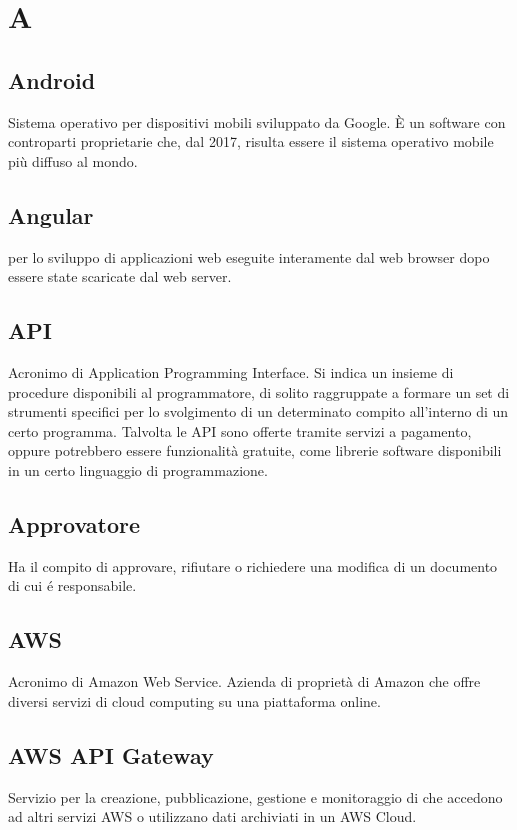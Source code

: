 \section*{A}
\markright{}

\subsection*{Android}
Sistema operativo per dispositivi mobili sviluppato da Google. È un software  con controparti proprietarie che, dal 2017, risulta essere il sistema operativo mobile più diffuso al mondo. 
 
\subsection*{Angular}
  per lo sviluppo di applicazioni web eseguite interamente dal web browser dopo essere state scaricate dal web server.

\subsection*{API}
Acronimo di Application Programming Interface. Si indica un  insieme  di  procedure disponibili al programmatore, di solito  raggruppate a formare un set di strumenti specifici per lo svolgimento di un determinato compito all'interno di un certo programma. Talvolta le API sono offerte tramite servizi a pagamento, oppure potrebbero essere funzionalità gratuite, come librerie software disponibili in un certo linguaggio di programmazione.

\subsection*{Approvatore}
Ha il compito di approvare, rifiutare o richiedere una modifica di un documento di cui é responsabile.

\subsection*{AWS}
Acronimo di Amazon Web Service. Azienda di proprietà di Amazon che offre diversi servizi di cloud computing su una piattaforma online.

\subsection*{AWS API Gateway}
Servizio  per la creazione, pubblicazione, gestione e monitoraggio di  che accedono ad altri servizi AWS o utilizzano dati archiviati in un AWS Cloud.

